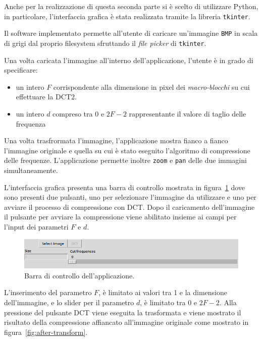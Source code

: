 \documentclass[a4paper, 12pt]{article}
\begin{document}
Anche per la realizzazione di questa seconda parte si è scelto di utilizzare
Python, in particolare, l'interfaccia grafica è stata realizzata tramite la
libreria \texttt{tkinter}.

Il software implementato permette all'utente di caricare un'immagine
\texttt{BMP} in scala di grigi dal proprio filesystem sfruttando il \textit{file
  picker} di \texttt{tkinter}.

Una volta caricata l'immagine all'interno dell'applicazione, l'utente è in grado
di specificare:

\begin{itemize}
  \item un intero $F$ corrispondente alla dimensione in pixel dei
        \textit{macro-blocchi} su cui effettuare la DCT2.
  \item un intero $d$ compreso tra $0$ e $2F - 2$ rappresentante il valore di
        taglio delle frequenza
\end{itemize}

Una volta trasfrormata l'immagine, l'applicazione mostra fianco a fianco
l'immagine originale e quella su cui è stato eseguito l'algoritmo di
compressione delle frequenze. L'applicazione permette inoltre \texttt{zoom} e
\texttt{pan} delle due immagini simultaneamente.

L'interfaccia grafica presenta una barra di controllo mostrata in 
figura~\ref{fig:control-bar} dove sono presenti due pulsanti, uno per 
selezionare l'immagine da utilizzare e uno per avviare il processo di 
compressione con DCT. Dopo il caricamento dell'immagine il pulsante per avviare 
la compressione viene abilitato insieme ai campi per l'input dei parametri 
$F$ e $d$.

\begin{figure}[h]
  \includegraphics[width=\textwidth]{./imgs/control-bar.png}
  \caption{Barra di controllo dell'applicazione.}
  \label{fig:control-bar}
\end{figure}

L'inserimento del parametro $F$, è limitato ai valori tra 1 e la dimensione 
dell'immagine, e lo slider per il parametro $d$, è limitato tra $0$ e $2F-2$.
Alla pressione del pulsante DCT viene eseguita la trasformata e viene mostrato
il risultato della compressione affiancato all'immagine originale come mostrato
in figura~\ref{fig:after-transform}.
\end{document}
